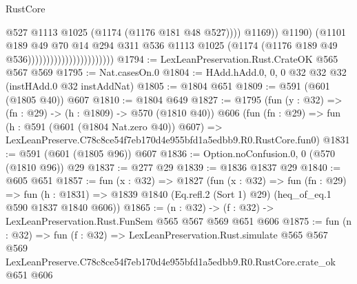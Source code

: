 \begin{lexlean}{RustCore}
\begin{coremodule}
                                                      @527
                                                      @1113
                                                      @1025
                                                      (@1174 (@1176 @181 @48 @527))))
                                                  @1169))
                                              @1190)
                                            (@1101
                                              @189
                                              @49
                                              @70
                                              @14
                                              @294
                                              @311
                                              @536
                                              @1113
                                              @1025
                                              (@1174 (@1176 @189 @49 @536)))))))))))))))))))))))
@1794 := LexLeanPreservation.Rust.CrateOK @565 @567 @569
@1795 := Nat.casesOn.{0}
@1804 := HAdd.hAdd.{0, 0, 0} @32 @32 @32 (instHAdd.{0} @32 instAddNat)
@1805 := @1804 @651
@1809 := @591 (@601 (@1805 @40)) @607
@1810 := @1804 @649
@1827 := @1795
    (fun (y : @32) => (fn : @29) -> (h : @1809) -> @570 (@1810 @40))
    @606
    (fun (fn : @29) =>
    fun (h : @591 (@601 (@1804 Nat.zero @40)) @607) =>
    LexLeanPreserve.C78c8ce54f7eb170d4e955bfd1a5edbb9.R0.RustCore.fun0)
@1831 := @591 (@601 (@1805 @96)) @607
@1836 := Option.noConfusion.{0, 0} (@570 (@1810 @96)) @29
@1837 := @277 @29
@1839 := @1836 @1837 @29
@1840 := @605 @651
@1857 := fun (x : @32) =>
  @1827
    (fun (x : @32) =>
    fun (fn : @29) =>
    fun (h : @1831) => @1839 @1840 (Eq.refl.{2} (Sort 1) @29) (heq_of_eq.{1} @590 @1837 @1840 @606))
@1865 := (n : @32) -> (f : @32) -> LexLeanPreservation.Rust.FunSem @565 @567 @569 @651 @606
@1875 := fun (n : @32) =>
  fun (f : @32) =>
  LexLeanPreservation.Rust.simulate
    @565
    @567
    @569
    LexLeanPreserve.C78c8ce54f7eb170d4e955bfd1a5edbb9.R0.RustCore.crate_ok
    @651
    @606
\end{coremodule}
\end{lexlean}
